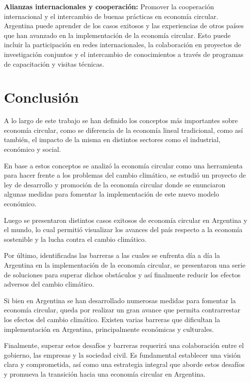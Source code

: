 \documentclass[runningheads]{llncs}
\begin{document}
\textbf{Alianzas internacionales y cooperación:} Promover la cooperación internacional y el intercambio de buenas prácticas en economía circular. Argentina puede aprender de los casos exitosos y las experiencias de otros países que han avanzado en la implementación de la economía circular. Esto puede incluir la participación en redes internacionales, la colaboración en proyectos de investigación conjuntos y el intercambio de conocimientos a través de programas de capacitación y visitas técnicas.

\section{Conclusión}

\hspace{0.5cm} A lo largo de este trabajo se han definido los conceptos más importantes sobre economía circular, como se diferencia de la economía lineal tradicional, como así también, el impacto de la misma en distintos sectores como el industrial, económico y social.

En base a estos conceptos se analizó la economía circular como una herramienta para hacer frente a los problemas del cambio climático, se estudió un proyecto de ley de  desarrollo y promoción de la economía circular donde se enunciaron algunas medidas para fomentar la implementación de este nuevo modelo económico. 

Luego se presentaron distintos casos exitosos de economía circular en Argentina y el mundo, lo cual permitió visualizar los avances del país respecto a la economía sostenible y la lucha contra el cambio climático.

Por último, identificadas las barreras a las cuales se enfrenta día a día la Argentina en la implementación de la economía circular, se presentaron una serie de soluciones para superar dichos obstáculos y así finalmente reducir los efectos adversos del cambio climático.

Si bien en Argentina se han desarrollado numerosas medidas para fomentar la economía circular, queda por realizar un gran avance que permita contrarrestar los efectos del cambio climático. Existen varias barreras que dificultan la implementación en Argentina, principalmente económicas y culturales.

Finalmente, superar estos desafíos y barreras requerirá una colaboración entre el gobierno, las empresas y la sociedad civil. Es fundamental establecer una visión clara y comprometida, así como una estrategia integral que aborde estos desafíos y promueva la transición hacia una economía circular en Argentina.
\end{document}

